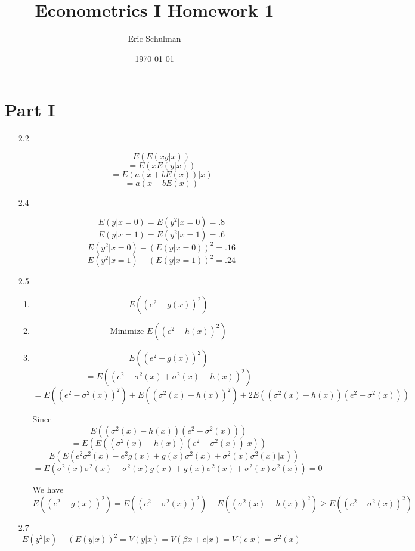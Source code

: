 \documentclass{article}
\title{Econometrics I Homework 1}
\author{Eric Schulman}
\date{\today}
\begin{document}
\maketitle

\section{Part I}

\begin{enumerate}
	\item[2.2] 

	$$E( E(xy | x))$$
	$$ = E( xE(y | x))$$
	$$ = E(a(x+bE(x))|x)$$
	$$= a(x+bE(x))$$
	
	\item[2.4]

	$$E(y|x=0) = E(y^2 |x=0)  = .8$$
	$$E(y|x=1) = E(y^2 |x=1)  = .6$$
	$$E(y^2|x=0) - (E(y|x=0))^2 = .16$$
	$$E(y^2|x=1) - (E(y|x=1))^2 = .24$$

	\item[2.5]
	\begin{enumerate} [label=\alph*)]
    	\item 

    	$$E((e^2-g(x))^2)$$
        
        \item 

        $$\text{Minimize } E((e^2-h(x))^2)$$
        
        \item 

        $$E((e^2-g(x))^2)$$
        $$ = E((e^2-\sigma^2(x) + \sigma^2(x) - h(x))^2)$$
        $$ = E((e^2-\sigma^2(x))^2) + E((\sigma^2(x) -h(x))^2) + 2E((\sigma^2(x) -h(x))(e^2-\sigma^2(x)))$$

        Since $$E((\sigma^2(x) -h(x))(e^2-\sigma^2(x)))$$
        $$ = E(E((\sigma^2(x) -h(x))(e^2-\sigma^2(x))|x))$$
        $$ = E(E(e^2\sigma^2(x) - e^2g(x) + g(x)\sigma^2(x) +\sigma^2(x) \sigma^2(x)|x))$$
        $$ = E(\sigma^2(x)\sigma^2(x) - \sigma^2(x)g(x) + g(x)\sigma^2(x) +\sigma^2(x) \sigma^2(x)) = 0$$

        We have
        $$E((e^2-g(x))^2) = E((e^2-\sigma^2(x))^2) + E((\sigma^2(x) -h(x))^2) \geq E((e^2-\sigma^2(x))^2) $$
    
    \end{enumerate} 

    \item[2.7]
    $$E(y^2|x) - (E(y|x))^2 = V(y|x) = V(\beta x + e |x) = V(e|x) = \sigma^2(x)$$


\end{enumerate}
\end{document}
